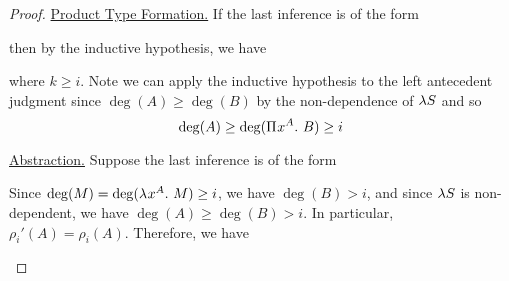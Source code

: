 \documentclass{article}
\begin{document}
\begin{proof}
\noindent\underline{Product Type Formation.}
If the last inference is of the form
\begin{prooftree}
\end{prooftree}
then by the inductive hypothesis, we have
\begin{prooftree}
\end{prooftree}
where $k \geq i$.
Note we can apply the inductive hypothesis to the left antecedent judgment since $\deg (A) \geq \deg(B)$ by the non-dependence of $\lS$ and so
\[
    \deg (A) \geq \deg(\PiT x A B) \geq i
\]

\noindent\underline{Abstraction.}
Suppose the last inference is of the form
\begin{prooftree}
\end{prooftree}
Since $\deg(M) = \deg(\lambdaT x A M) \geq i$, we have $\deg(B) > i$, and since $\lS$ is non-dependent, we have $\deg (A) \geq \deg(B) > i$.
In particular, $\rho_i'(A) = \rho_i(A)$. 
Therefore, we have
\begin{prooftree}
\end{prooftree}


\end{proof}
\end{document}
